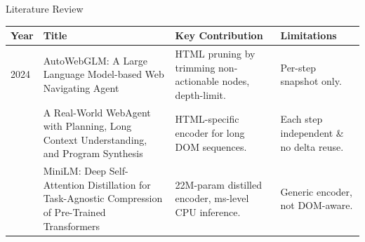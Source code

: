 \begin{frame}{Literature Review}
  \lrtable
  \begin{tabularx}{\textwidth}{p{0.7cm} p{2.8cm} X X}
    \toprule
    \textbf{Year} & \textbf{Title} & \textbf{Key Contribution} & \textbf{Limitations} \\
    \midrule
    2024 \cite{lai2024autowebglm}
    & AutoWebGLM: A Large Language Model-based Web Navigating Agent
    & HTML pruning by trimming non-actionable nodes, depth-limit.
    & Per-step snapshot only. \\
    \addlinespace
    2023 \cite{gur2024webagent}
    & A Real-World WebAgent with Planning, Long Context Understanding, and Program Synthesis
    & HTML-specific encoder for long DOM sequences.
    & Each step independent \& no delta reuse. \\
    \addlinespace
    2020 \cite{wang2020minilm}
    & MiniLM: Deep Self-Attention Distillation for Task-Agnostic Compression of Pre-Trained Transformers
    & 22M-param distilled encoder, ms-level CPU inference.
    & Generic encoder, not DOM-aware. \\
    \bottomrule
  \end{tabularx}
\end{frame}

